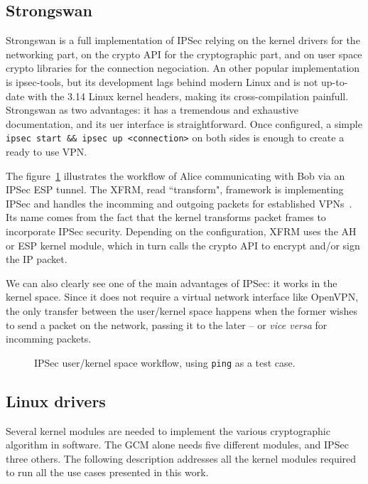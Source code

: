 

\subsection{Strongswan}
Strongswan is a full implementation of IPSec relying on the kernel drivers for the networking part, on the crypto API for the cryptographic part, and on user space crypto libraries for the connection negociation.
An other popular implementation is ipsec-tools, but its development lags behind modern Linux and is not up-to-date with the 3.14 Linux kernel headers, making its cross-compilation painfull.
Strongswan as two advantages: it has a tremendous and exhaustive documentation, and its uer interface is straightforward.
Once configured, a simple \texttt{ipsec start \&\& ipsec up <connection>} on both sides is enough to create a ready to use VPN.

The figure~\ref{fig:ipsec-workflow} illustrates the workflow of Alice communicating with Bob via an IPSec ESP tunnel.
The XFRM, read ``transform", framework is implementing IPSec and handles the incomming and outgoing packets for established VPNs~\cite{rosen2014}.
Its name comes from the fact that the kernel transforms packet frames to incorporate IPSec security.
Depending on the configuration, XFRM uses the AH or ESP kernel module, which in turn calls the crypto API to encrypt and/or sign the IP packet.

We can also clearly see one of the main advantages of IPSec: it works in the kernel space.
Since it does not require a virtual network interface like OpenVPN, the only transfer between the user/kernel space happens when the former wishes to send a packet on the network, passing it to the later -- or \textit{vice versa} for incomming packets.

\begin{figure}[ht]
\Large
\resizebox{\linewidth}{!}{%

}
\caption{IPSec user/kernel space workflow, using \texttt{ping} as a test case.}{}
\label{fig:ipsec-workflow}
\end{figure}


\subsection{Linux drivers}
Several kernel modules are needed to implement the various cryptographic algorithm in software.
The GCM alone needs five different modules, and IPSec three others.
The following description addresses all the kernel modules required to run all the use cases presented in this work.


